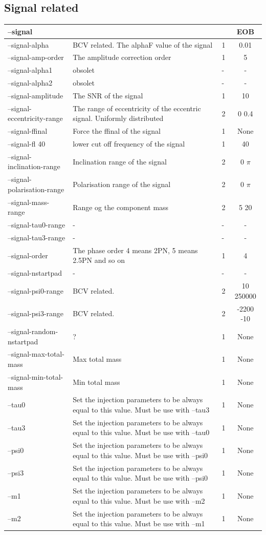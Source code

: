 \documentclass[a4paper,10pt]{article}
\begin{document}
\subsection{Signal related}
\begin{center}
\begin{tabular}{|l|p{8cm}|p{3cm}|c|}
\hline
--signal &&&EOB\\\hline
--signal-alpha& BCV related. The alphaF value of the signal&1&0.01\\\hline
--signal-amp-order&The amplitude correction order&1&5\\\hline
--signal-alpha1&obsolet&-&-\\\hline
--signal-alpha2&obsolet&-&-\\\hline
--signal-amplitude&The SNR of the signal&1&10\\\hline
--signal-eccentricity-range&The range of eccentricity of the eccentric signal. Uniformly distributed&2&0 0.4\\\hline
--signal-ffinal&Force the ffinal of the signal& 1&None\\\hline
--signal-fl 40&lower cut off frequency of the signal&1&40\\\hline
--signal-inclination-range&Inclination range of the signal&2&0 $\pi$\\\hline
--signal-polarisation-range&Polarisation range of the signal&2&0 $\pi$\\\hline
--signal-mass-range&Range og the component mass&2&5 20\\\hline
--signal-tau0-range&-&-&-\\\hline
--signal-tau3-range&-&-&-\\\hline
--signal-order&The phase order 4 means 2PN, 5 means 2.5PN and so on&1&4\\\hline
--signal-nstartpad&-&-&-\\\hline
--signal-psi0-range&BCV related.&2&10 250000\\\hline
--signal-psi3-range&BCV related.&2&-2200 -10\\\hline
--signal-random-nstartpad&?&1&None\\\hline
--signal-max-total-mass&Max total mass &1&None\\\hline
--signal-min-total-mass&Min total mass&1&None\\\hline
\hline
--tau0 &Set the injection parameters to be always equal to this value. Must be use with --tau3&1&None\\\hline
--tau3 &Set the injection parameters to be always equal to this value. Must be use with --tau0&1&None\\\hline
--psi0 &Set the injection parameters to be always equal to this value. Must be use with --psi0&1&None\\\hline
--psi3 &Set the injection parameters to be always equal to this value. Must be use with --psi0&1&None\\\hline
--m1 &Set the injection parameters to be always equal to this value. Must be use with --m2&1&None\\\hline
--m2 &Set the injection parameters to be always equal to this value. Must be use with --m1&1&None\\\hline


\end{tabular}
\end{center}
\end{document}
